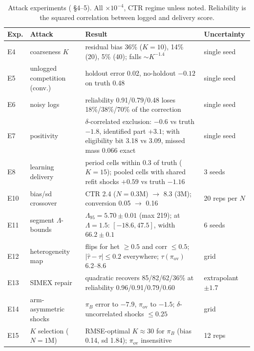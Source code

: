 \begin{table}[htbp]
\centering\footnotesize
\caption{Attack experiments ( \S4--5). All $\times10^{-4}$, CTR regime unless noted. Reliability is the squared correlation between logged and delivery score.}
\label{algo:tab:attacks}
\begin{tabularx}{\textwidth}{llXl}
\toprule
Exp. & Attack & Result & Uncertainty \\
\midrule
E4 & coarseness $K$ & residual bias 36\% ($K=10$), 14\% (20), 5\% (40); falls $\sim K^{-1.4}$ & single seed \\
E5 & unlogged competition (conv.) & holdout error 0.02, no-holdout $-0.12$ on truth 0.48 & single seed \\
E6 & noisy logs & reliability 0.91/0.79/0.48 loses 18\%/38\%/70\% of the correction & single seed \\
E7 & positivity & $\delta$-correlated exclusion: $-0.6$ vs truth $-1.8$, identified part $+3.1$; with eligibility bit 3.18 vs 3.09, missed mass 0.066 exact & single seed \\
E8 & learning delivery & period cells within 0.3 of truth ($K = 15$); pooled cells with shared refit shocks $+0.59$ vs truth $-1.16$ & 3 seeds \\
E10 & bias/sd crossover & CTR 2.4 ($N = 0.3$M) $\to$ 8.3 (3M); conversion 0.05 $\to$ 0.16 & 20 reps per $N$ \\
E11 & segment $\Lambda$-bounds & $\Lambda_{95} = 5.70 \pm 0.01$ (max 219); at $\Lambda = 1.5$: $[-18.6, 47.5]$, width $66.2 \pm 0.1$ & 6 seeds \\
E12 & heterogeneity map & flips for het $\ge 0.5$ and corr $\le 0.5$; $|\hat\tau - \tau| \le 0.2$ everywhere; $\tau(\pi_{\mathrm{ov}})$ 6.2--8.6 & grid \\
E13 & SIMEX repair & quadratic recovers 85/82/62/36\% at reliability 0.96/0.91/0.79/0.60 & extrapolant $\pm 1.7$ \\
E14 & arm-asymmetric shocks & $\pi_B$ error to $-7.9$, $\pi_{\mathrm{ov}}$ to $-1.5$; $\delta$-uncorrelated shocks $\le 0.25$ & grid \\
E15 & $K$ selection ($N = 1$M) & RMSE-optimal $K \approx 30$ for $\pi_B$ (bias 0.14, sd 1.84); $\pi_{\mathrm{ov}}$ insensitive & 12 reps \\
\bottomrule
\end{tabularx}
\end{table}

